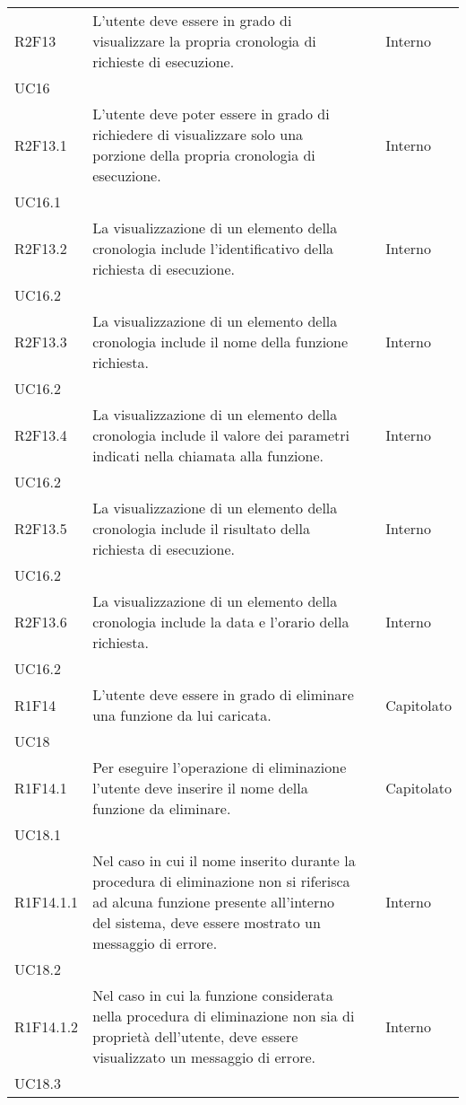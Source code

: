 \begin{longtable}{ 
		>{\centering}p{} 
		>{}p{} 
		>{\centering}p{}
		>{\centering}p{} }
	R2F13 & L'utente deve essere in grado di visualizzare la propria cronologia 
		di richieste di esecuzione. 													& \de & Interno \\ UC16 \tabularnewline
	R2F13.1 & L'utente deve poter essere in grado di richiedere di visualizzare
		solo una porzione della propria cronologia di esecuzione. 					& \de & Interno \\ UC16.1 \tabularnewline
	R2F13.2 & La visualizzazione di un elemento della cronologia include 
		l'identificativo della richiesta di esecuzione. 								& \de & Interno \\ UC16.2 \tabularnewline
	R2F13.3 & La visualizzazione di un elemento della cronologia include 
		il nome della funzione richiesta. 											& \de & Interno \\ UC16.2 \tabularnewline				
	R2F13.4 & La visualizzazione di un elemento della cronologia include 
		il valore dei parametri indicati nella chiamata alla funzione.				& \de & Interno \\ UC16.2 \tabularnewline
	R2F13.5 & La visualizzazione di un elemento della cronologia include 
		il risultato della richiesta di esecuzione.									& \de & Interno \\ UC16.2 \tabularnewline
	R2F13.6 & La visualizzazione di un elemento della cronologia include 
		la data e l'orario della richiesta. 											& \de & Interno \\ UC16.2 \tabularnewline
	
	R1F14 & L'utente deve essere in grado di eliminare una funzione da lui caricata. & \ob & Capitolato \\ UC18 \tabularnewline
	R1F14.1 & Per eseguire l'operazione di eliminazione l'utente deve inserire 
		il nome della funzione da eliminare. 										& \ob & Capitolato \\ UC18.1 \tabularnewline
	R1F14.1.1 & Nel caso in cui il nome inserito durante la procedura di eliminazione
		non si riferisca ad alcuna funzione presente all'interno del sistema, deve 
		essere mostrato un messaggio di errore.										& \ob & Interno \\ UC18.2 \tabularnewline
	R1F14.1.2 & Nel caso in cui la funzione considerata nella procedura di eliminazione
		non sia di proprietà dell'utente, deve essere visualizzato un messaggio 
		di errore.																	& \ob & Interno \\ UC18.3 \tabularnewline

\end{longtable}